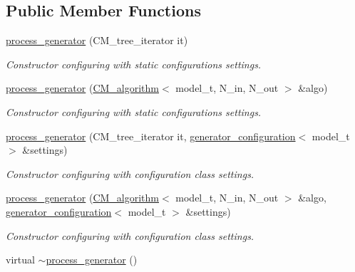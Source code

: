 \subsection*{Public Member Functions}
\begin{DoxyCompactItemize}
\item 
\hypertarget{a00430_a0f5cb16d0b283bf1ac84ab44c22c3429}{\hyperlink{a00430_a0f5cb16d0b283bf1ac84ab44c22c3429}{process\-\_\-generator} (C\-M\-\_\-tree\-\_\-iterator it)}\label{a00430_a0f5cb16d0b283bf1ac84ab44c22c3429}

\begin{DoxyCompactList}\small\item\em Constructor configuring with static configurations settings. \end{DoxyCompactList}\item 
\hyperlink{a00430_acd75bb7e3233790bd5ef470328b3bf34}{process\-\_\-generator} (\hyperlink{a00070}{C\-M\-\_\-algorithm}$<$ model\-\_\-t, N\-\_\-in, N\-\_\-out $>$ \&algo)
\begin{DoxyCompactList}\small\item\em Constructor configuring with static configurations settings. \end{DoxyCompactList}\item 
\hypertarget{a00430_a510d2951c9b3bca42d6c52a1366e55d5}{\hyperlink{a00430_a510d2951c9b3bca42d6c52a1366e55d5}{process\-\_\-generator} (C\-M\-\_\-tree\-\_\-iterator it, \hyperlink{a00237}{generator\-\_\-configuration}$<$ model\-\_\-t $>$ \&settings)}\label{a00430_a510d2951c9b3bca42d6c52a1366e55d5}

\begin{DoxyCompactList}\small\item\em Constructor configuring with configuration class settings. \end{DoxyCompactList}\item 
\hyperlink{a00430_a10892b56e422f4ed447a0078767d6e7a}{process\-\_\-generator} (\hyperlink{a00070}{C\-M\-\_\-algorithm}$<$ model\-\_\-t, N\-\_\-in, N\-\_\-out $>$ \&algo, \hyperlink{a00237}{generator\-\_\-configuration}$<$ model\-\_\-t $>$ \&settings)
\begin{DoxyCompactList}\small\item\em Constructor configuring with configuration class settings. \end{DoxyCompactList}\item 
\hypertarget{a00430_afa8f2cca8dd5cae269109a20d1a97826}{virtual \hyperlink{a00430_afa8f2cca8dd5cae269109a20d1a97826}{$\sim$process\-\_\-generator} ()}\label{a00430_afa8f2cca8dd5cae269109a20d1a97826}


\end{DoxyCompactItemize}
